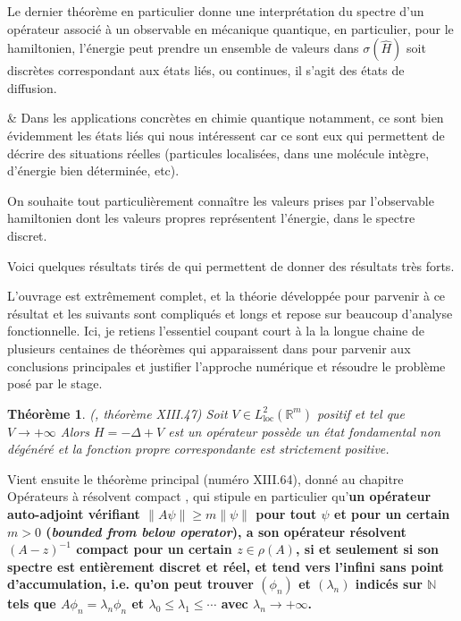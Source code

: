 \documentclass[svgnames,dvipsnames,a4paper,10pt,french]{report}
\newtheorem{theorem}{Théorème}[section]
\begin{document}
Le dernier théorème en particulier donne une interprétation du spectre d'un opérateur associé à un observable en mécanique quantique, en particulier, pour le hamiltonien, l'énergie peut prendre un ensemble de valeurs dans $\sigma(\hat{H})$ soit discrètes correspondant aux états liés, ou continues, il s'agit des états de diffusion.


&
Dans les applications concrètes en chimie quantique notamment, ce sont bien évidemment les états liés qui nous intéressent car ce sont eux qui permettent de décrire des situations réelles (particules localisées, dans une molécule intègre, d'énergie bien déterminée, etc).

On souhaite tout particulièrement connaître les valeurs prises par l'observable hamiltonien dont les valeurs propres représentent l'énergie, dans le spectre discret.

Voici quelques résultats tirés de \cite{reed_methods_1980} qui permettent de donner des résultats très forts.

L'ouvrage \cite{reed_methods_1980} est extrêmement complet, et la théorie développée pour parvenir à ce résultat et les suivants sont compliqués et longs et repose sur beaucoup d'analyse fonctionnelle. Ici, je retiens l'essentiel coupant court à la la longue chaine de plusieurs centaines de théorèmes qui apparaissent dans  \cite{reed_methods_1980} pour parvenir aux conclusions principales et justifier l'approche numérique et résoudre le problème posé par le stage.



\begin{theorem}{(\cite{reed_methods_1980},  théorème XIII.47)}
    Soit $V \in L_\text{loc}^2(\mathbb{R}^m)$ positif et  tel que $V\rightarrow +\infty$ Alors $H=-\Delta +V$ est un opérateur possède un état fondamental non dégénéré et la fonction propre correspondante est strictement positive.
\end{theorem}


 Vient ensuite le théorème principal (numéro XIII.64), donné au chapitre \og Opérateurs à résolvent compact \fg{}, qui stipule en particulier qu'\textbf{un opérateur auto-adjoint vérifiant $\|A\psi \| \ge m \|\psi\|$ pour tout $\psi$ et pour un certain $m>0$ (\textit{bounded from below operator}), a son opérateur résolvent $(A-z)^{-1}$ compact pour un certain $z\in\rho(A)$, si et seulement si son spectre est entièrement discret et réel, et tend vers l'infini sans point d'accumulation, i.e. qu'on peut trouver $(\phi_n)$ et $(\lambda_n)$ indicés sur $\mathbb{N}$ tels que $A\phi_n =\lambda_n \phi_n$ et $\lambda_0 \le \lambda_1 \le \cdots$ avec $\lambda_n \rightarrow + \infty$.}
\end{document}
